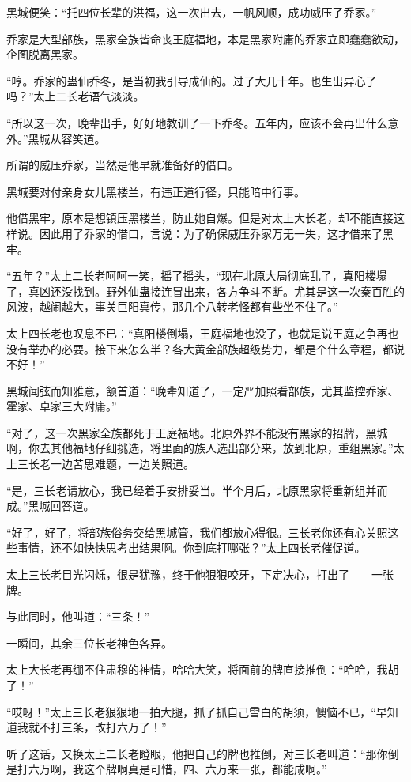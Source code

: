 \begin{this_body}
黑城便笑：“托四位长辈的洪福，这一次出去，一帆风顺，成功威压了乔家。”

乔家是大型部族，黑家全族皆命丧王庭福地，本是黑家附庸的乔家立即蠢蠢欲动，企图脱离黑家。

“哼。乔家的蛊仙乔冬，是当初我引导成仙的。过了大几十年。也生出异心了吗？”太上二长老语气淡淡。

“所以这一次，晚辈出手，好好地教训了一下乔冬。五年内，应该不会再出什么意外。”黑城从容笑道。

所谓的威压乔家，当然是他早就准备好的借口。

黑城要对付亲身女儿黑楼兰，有违正道行径，只能暗中行事。

他借黑牢，原本是想镇压黑楼兰，防止她自爆。但是对太上大长老，却不能直接这样说。因此用了乔家的借口，言说：为了确保威压乔家万无一失，这才借来了黑牢。

“五年？”太上二长老呵呵一笑，摇了摇头，“现在北原大局彻底乱了，真阳楼塌了，真凶还没找到。野外仙蛊接连冒出来，各方争斗不断。尤其是这一次秦百胜的风波，越闹越大，事关巨阳真传，那几个八转老怪都有些坐不住了。”

太上四长老也叹息不已：“真阳楼倒塌，王庭福地也没了，也就是说王庭之争再也没有举办的必要。接下来怎么半？各大黄金部族超级势力，都是个什么章程，都说不好！”

黑城闻弦而知雅意，颔首道：“晚辈知道了，一定严加照看部族，尤其监控乔家、霍家、卓家三大附庸。”

“对了，这一次黑家全族都死于王庭福地。北原外界不能没有黑家的招牌，黑城啊，你去其他福地仔细挑选，将里面的族人选出部分来，放到北原，重组黑家。”太上三长老一边苦思难题，一边关照道。

“是，三长老请放心，我已经着手安排妥当。半个月后，北原黑家将重新组并而成。”黑城回答道。

“好了，好了，将部族俗务交给黑城管，我们都放心得很。三长老你还有心关照这些事情，还不如快快思考出结果啊。你到底打哪张？”太上四长老催促道。

太上三长老目光闪烁，很是犹豫，终于他狠狠咬牙，下定决心，打出了――一张牌。

与此同时，他叫道：“三条！”

一瞬间，其余三位长老神色各异。

太上大长老再绷不住肃穆的神情，哈哈大笑，将面前的牌直接推倒：“哈哈，我胡了！”

“哎呀！”太上三长老狠狠地一拍大腿，抓了抓自己雪白的胡须，懊恼不已，“早知道我就不打三条，改打六万了！”

听了这话，又换太上二长老瞪眼，他把自己的牌也推倒，对三长老叫道：“那你倒是打六万啊，我这个牌啊真是可惜，四、六万来一张，都能成啊。”


\end{this_body}
